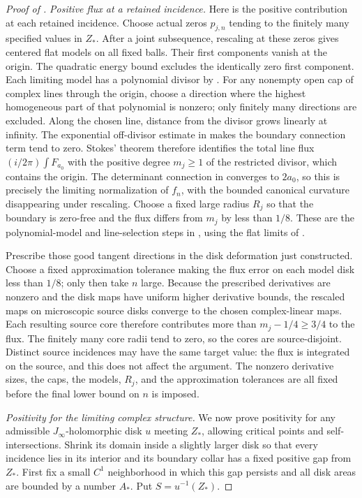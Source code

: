 \begin{proof}[Proof of ]
\smallskip
\noindent\emph{Positive flux at a retained incidence.}
Here is the positive contribution at each retained incidence.
Choose actual zeros \(p_{j,n}\) tending to the finitely many
specified values in \(Z_*\).  After a joint subsequence, rescaling
at these zeros gives centered flat models on all fixed balls.
Their first components vanish at the origin.  The quadratic energy
bound excludes the identically zero first component.  Each limiting
model has a polynomial divisor by
\cite[Proposition~5.1]{Taubes1999}.
For any nonempty open cap of complex lines through the origin,
choose a direction where the highest homogeneous part of that
polynomial is nonzero; only finitely many directions are excluded.
Along the chosen line, distance from the divisor grows linearly
at infinity.  The exponential off-divisor estimate in
\cite[Proposition~5.1]{Taubes1999} makes the boundary connection
term tend to zero.  Stokes' theorem therefore identifies the total
line flux \((i/2\pi)\int F_{a_0}\) with the positive degree
\(m_j\ge1\) of the restricted divisor, which contains the
origin.  The determinant connection in
\cite[Proposition~5.2]{Taubes1999} converges to \(2a_0\), so
this is precisely the limiting normalization of \(f_n\), with
the bounded canonical curvature disappearing under rescaling.
Choose a fixed
large radius \(R_j\) so that the boundary is zero-free and the
flux differs from \(m_j\) by less than \(1/8\).
These are the polynomial-model and line-selection steps in
\cite[Proposition~5.6, Steps~3--4]{Taubes1996}, using the flat
limits of \cite[Proposition~5.2]{Taubes1999}.

Prescribe those good tangent directions in the disk deformation
just constructed.  Choose a fixed approximation tolerance making
the flux error on each model disk less than \(1/8\); only then
take \(n\) large.  Because the prescribed derivatives are
nonzero and the disk maps have uniform higher derivative bounds,
the rescaled maps on microscopic source disks converge to the
chosen complex-linear maps.  Each resulting source core therefore
contributes more than \(m_j-1/4\ge3/4\) to the flux.
The finitely many core radii tend to zero, so the cores are
source-disjoint.  Distinct source incidences may have the same
target value: the flux is integrated on the source, and this does
not affect the argument.  The nonzero derivative sizes, the caps,
the models, \(R_j\), and the approximation tolerances are all
fixed before the final lower bound on \(n\) is imposed.

\smallskip
\noindent\emph{Positivity for the limiting complex structure.}
We now prove positivity for any admissible
\(J_\infty\)-holomorphic disk \(u\) meeting \(Z_*\),
allowing critical points and self-intersections.  Shrink its domain
inside a slightly larger disk so that every incidence lies in its
interior and its boundary collar has a fixed positive gap from
\(Z_*\).  First fix a small \(C^1\) neighborhood in which
this gap persists and all disk areas are bounded by a number
\(A_*\).  Put \(S=u^{-1}(Z_*)\).


\end{proof}
